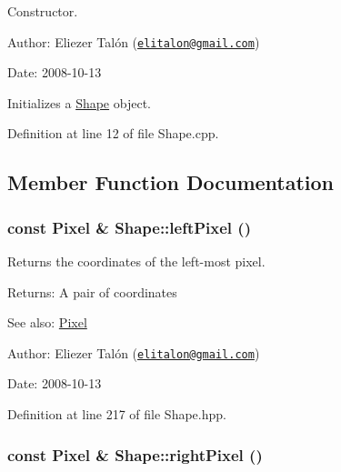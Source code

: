 Constructor. 

\begin{Desc}
\item[Author:]Eliezer Talón (\href{mailto:elitalon@gmail.com}{\tt elitalon@gmail.com}) \end{Desc}
\begin{Desc}
\item[Date:]2008-10-13\end{Desc}
Initializes a \hyperlink{class_shape}{Shape} object. 

Definition at line 12 of file Shape.cpp.

\subsection{Member Function Documentation}
\hypertarget{class_shape_2459925c87fd67a5fe3baf25f0ff41d3}{
\subsubsection[leftPixel]{\setlength{\rightskip}{0pt plus 5cm}const {\bf Pixel} \& Shape::leftPixel ()}}
\label{class_shape_2459925c87fd67a5fe3baf25f0ff41d3}


Returns the coordinates of the left-most pixel. 

\begin{Desc}
\item[Returns:]A pair of coordinates\end{Desc}
\begin{Desc}
\item[See also:]\hyperlink{_pixel_8hpp_535e59456e3e633842529cfa8ea103c4}{Pixel}\end{Desc}
\begin{Desc}
\item[Author:]Eliezer Talón (\href{mailto:elitalon@gmail.com}{\tt elitalon@gmail.com}) \end{Desc}
\begin{Desc}
\item[Date:]2008-10-13 \end{Desc}


Definition at line 217 of file Shape.hpp.\hypertarget{class_shape_86841a53f5d82ba696406ef29f908d4f}{
\subsubsection[rightPixel]{\setlength{\rightskip}{0pt plus 5cm}const {\bf Pixel} \& Shape::rightPixel ()}}
\label{class_shape_86841a53f5d82ba696406ef29f908d4f}


